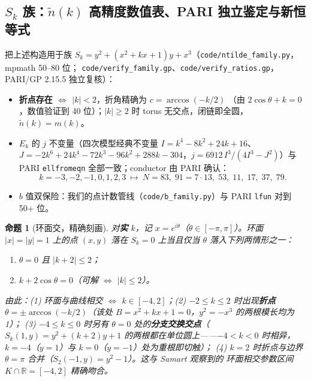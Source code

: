 \documentclass[11pt,a4paper]{ctexart}
\newtheorem{proposition}[theorem]{命题}
\theoremstyle{remark}
\newcommand{\RR}{\mathbb{R}}
\begin{document}
\subsection{$S_k$ 族：$\tilde n(k)$ 高精度数值表、PARI 独立鉴定与新恒等式}\label{sec:family}

把上述构造用于族 $S_k=y^2+(x^2+kx+1)y+x^3$（\texttt{code/ntilde\_family.py}，mpmath 50--80 位；
\texttt{code/verify\_family.gp}、\texttt{code/verify\_ratios.gp}，PARI/GP 2.15.5 独立复核）：
\begin{itemize}[nosep]
\item \textbf{折点存在 $\Longleftrightarrow$ $|k|<2$}，折角精确为 $c=\arccos(-k/2)$
（由 $2\cos\theta+k=0$，数值验证到 40 位）；$|k|\ge2$ 时 torus 无交点，闭链即全圆，$\tilde n(k)=m(k)$。
\item $E_k$ 的 $j$ 不变量（四次模型经典不变量 $I=k^4-8k^2+24k+16$、
$J=-2k^6+24k^4-72k^3-96k^2+288k-304$，$j=6912\,I^3/(4I^3-J^2)$）与 PARI \texttt{ellfromeqn}
全部一致；conductor 由 PARI 确认：
\[
k=-3,-2,-1,0,1,2,3\ \mapsto\ N=83,\;91=7\cdot13,\;53,\;11,\;17,\;37,\;79.
\]
\item $b$ 值双保险：我们的点计数管线（\texttt{code/b\_family.py}）与 PARI \texttt{lfun} 对到 50+ 位。
\end{itemize}

\begin{proposition}[环面交，精确刻画]\label{prop:torus}
对\textbf{实} $k$，记 $x=e^{i\theta}$（$\theta\in[-\pi,\pi]$）。环面 $|x|=|y|=1$ 上的点
$(x,y)$ 落在 $S_k=0$ 上当且仅当 $\theta$ 落入下列两情形之一：
\begin{enumerate}[nosep,label=(\roman*)]
\item $\theta=0$ 且 $|k+2|\le2$；
\item $k+2\cos\theta=0$（可解 $\Longleftrightarrow$ $|k|\le2$）。
\end{enumerate}
由此：(1) 环面与曲线相交 $\Longleftrightarrow$ $k\in[-4,2]$；(2) $-2\le k\le2$ 时出现\textbf{折点}
$\theta=\pm\arccos(-k/2)$（该处 $B=x^2+kx+1=0$，$y^2=-x^3$ 的两根模长均为 1）；
(3) $-4\le k\le0$ 时另有 $\theta=0$ 处的\textbf{分支交换交点}（$S_k(1,y)=y^2+(k+2)y+1$
的两根都在单位圆上——$-4<k<0$ 时相异，$k=-4$（$y=1$）与 $k=0$（$y=-1$）处为重根即切触）；
(4) $k=2$ 时折点与边界 $\theta=\pi$ 合并（$S_2(-1,y)=y^2-1$）。这与 Samart 观察到的
环面相交参数区间 $K\cap\RR=[-4,2]$ 精确吻合。
\end{proposition}
\end{document}
